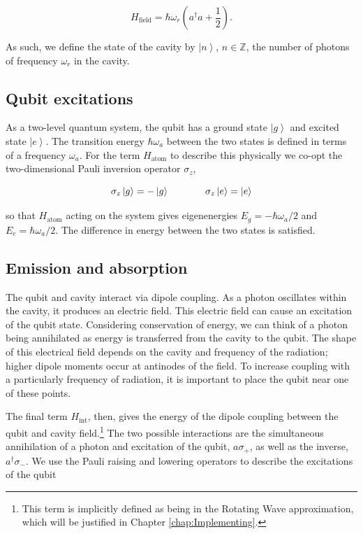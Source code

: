 \documentclass[11 pt, oneside]{book} %
\newcommand{\ket}[1]{\left| #1 \right>} %
\begin{document}
\begin{equation}
H_{\mathrm{field}}=\hbar \omega_r(a^\dag a+\frac{1}{2}).
\end{equation}

As such, we define the state of the cavity by $\ket{n}$, $n \in \mathbb{Z}$, the number of photons of frequency $\omega_r$ in the cavity.

\subsection{Qubit excitations}
As a two-level quantum system, the qubit has a ground state $\ket{g}$ and excited state $\ket{e}$. The transition energy $\hbar \omega_a$ between the two states is defined in terms of a frequency $\omega_a$. For the term $H_{\mathrm{atom}}$ to describe this physically we co-opt the two-dimensional Pauli inversion operator $\sigma_z$,

\begin{equation}
\sigma_z\ket{g}=-\ket{g} \hspace{1.3cm} \sigma_z\ket{e}=\ket{e}
\end{equation}

so that $H_{\mathrm{atom}}$ acting on the system gives eigenenergies $E_g=-\hbar\omega_a/2$ and $E_e=\hbar\omega_a/2$. The difference in energy between the two states is satisfied. 

\subsection{Emission and absorption}\label{sec:Emission}
The qubit and cavity interact via dipole coupling. As a photon oscillates within the cavity, it produces an electric field. This electric field can cause an excitation of the qubit state. Considering conservation of energy, we can think of a photon being annihilated as energy is transferred from the cavity to the qubit. The shape of this electrical field depends on the cavity and frequency of the radiation; higher dipole moments occur at antinodes of the field. To increase coupling with a particularly frequency of radiation, it is important to place the qubit near one of these points.   

The final term $H_{\mathrm{int}}$, then, gives the energy of the dipole coupling between the qubit and cavity field.\footnote{This term is implicitly defined as being in the Rotating Wave approximation, which will be justified in Chapter \ref{chap:Implementing}.} The two possible interactions are the simultaneous annihilation of a photon and excitation of the qubit, $a\sigma_+$, as well as the inverse, $a^\dag \sigma_-$. We use the Pauli raising and lowering operators to describe the excitations of the qubit
\end{document}

